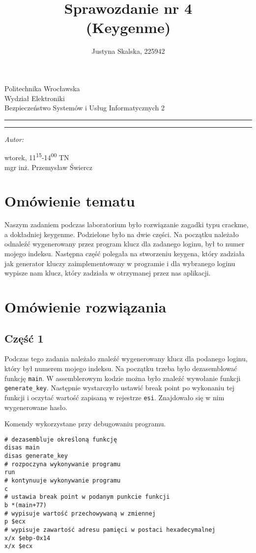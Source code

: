 \documentclass[12pt,a4paper,titlepage]{article}
\author{Justyna Skalska, 225942}
\title{Sprawozdanie nr 4\\
(Keygenme)}
\makeatletter
\newcommand{\linia}{\rule{\linewidth}{0.4mm}}
\renewcommand{\maketitle}{\begin{titlepage}
    \vspace*{1cm}
    \begin{center}\small
    Politechnika Wrocławska\\
    Wydział Elektroniki\\
    Bezpieczeństwo Systemów i Usług Informatycznych 2
    \end{center}
    \vspace{3cm}
    \noindent\linia
    \begin{center}
      \LARGE \textsc{\@title}
         \end{center}
     \linia
    \vspace{0.5cm}
    \begin{flushright}
    \begin{minipage}{7cm}
    \textit{\small Autor:}\\
    \normalsize \textsc{\@author} \par
    \end{minipage}
    \vspace{5cm}

     {\small wtorek, 11\textsuperscript{15}-14\textsuperscript{00} TN}\\
        mgr inż. Przemysław Świercz
     \end{flushright}
    \vspace*{\stretch{6}}
    \begin{center}
    \@date
    \end{center}
  \end{titlepage}%
}
\makeatother
\begin{document}
\maketitle

\tableofcontents 
\newpage

\section{Omówienie tematu}
Naszym zadaniem podczas laboratorium było rozwiązanie zagadki typu crackme, a dokładniej keygenme. Podzielone było na dwie części. Na początku należało odnaleźć wygenerowany przez program klucz dla zadanego loginu, był to numer mojego indeksu. Następna część polegała na stworzeniu keygena, który zadziała jak generator kluczy zaimplementowany w programie i dla wybranego loginu wypisze nam klucz, który zadziała w otrzymanej przez nas aplikacji.

\section{Omówienie rozwiązania}

\subsection{Część 1}
Podczas tego zadania należało znaleźć wygenerowany klucz dla podanego loginu, który był numerem mojego indeksu. Na początku trzeba było dezasemblować funkcję \texttt{main}. W assemblerowym kodzie można było znaleźć wywołanie funkcji \texttt{generate_key}. Następnie wystarczyło ustawić break point po wykonaniu tej funkcji i oczytać wartość zapisaną w rejestrze \texttt{esi}. Znajdowało się w nim wygenerowane hasło.

\begin{listing}[H]
\caption{Komendy wykorzystane przy debugowaniu programu.}
\begin{verbatim}
# dezasembluje określoną funkcję
disas main
disas generate_key
# rozpoczyna wykonywanie programu
run
# kontynuuje wykonywanie programu
c
# ustawia break point w podanym punkcie funkcji
b *(main+77)
# wypisuje wartość przechowywaną w zmiennej
p $ecx
# wypisuje zawartość adresu pamięci w postaci hexadecymalnej
x/x $ebp-0x14       
x/x $ecx
\end{verbatim}
\end{listing}
\end{document}
